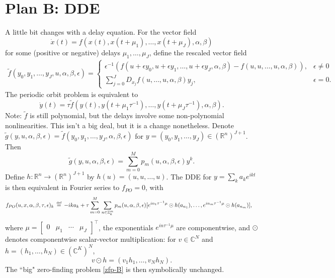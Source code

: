 \documentclass[10pt]{article}
\newcommand{\bydef}{\,\stackrel{\mbox{\tiny\textnormal{\raisebox{0ex}[0ex][0ex]{def}}}}{=}\,}
\newcommand{\R}{\mathbb{R}}
\newcommand{\Z}{\mathbb{Z}}
\newcommand{\C}{\mathbb{C}}
\begin{document}
\section{Plan B: DDE}
A little bit changes with a delay equation. For the vector field
$$\dot x(t)=f(x(t),x(t+\mu_1),\dots,x(t+\mu_J),\alpha,\beta)$$ for some (positive or negative) delays $\mu_1,\dots,\mu_J$, define the rescaled vector field
\begin{align*}
\tilde f(y_0,y_1,\dots,y_J,u,\alpha,\beta,\epsilon)=\left\{\begin{array}{ll}
\epsilon^{-1}(f(u+\epsilon y_0,u+\epsilon y_1,\dots,u+\epsilon y_J,\alpha,\beta)-f(u,u,\dots,u,\alpha,\beta)),&\epsilon\neq 0\\
\sum_{j=0}^J D_{x_j}f(u,\dots,u,\alpha,\beta)y_j,&\epsilon=0.\end{array}\right.
\end{align*}
The periodic orbit problem is equivalent to
$$\dot y(t) = \tau\tilde f(y(t),y(t+\mu_1\tau^{-1}),\dots,y(t+\mu_J\tau^{-1}),\alpha,\beta).$$
Note: $\tilde f$ is still polynomial, but the delays involve some non-polynomial nonlinearities. This isn't a big deal, but it is a change nonetheless.
Denote $\tilde g(y,u,\alpha,\beta,\epsilon)=\tilde f(y_0,y_1,\dots,y_J,\alpha,\beta,\epsilon)$ for $y=(y_0,y_1,\dots,y_J)\in(\R^n)^{J+1}$. Then
$$\tilde g(y,u,\alpha,\beta,\epsilon)=\sum_{m=0}^M p_m(u,\alpha,\beta,\epsilon)y^k.$$
Define $h:\R^n\rightarrow(\R^n)^{J+1}$ by $h(u)=(u,u,\dots,u)$. The DDE for $y=\sum_k a_ke^{ikt}$ is then equivalent in Fourier series to $f_{PO}=0$, with
\begin{align*}
f_{PO}(u,x,\alpha,\beta,\tau,\epsilon)_k&\bydef-ika_k + \tau\sum_{m=0}^M\hspace{0.5mm}\sum_{n\in \Z^m_k}p_m(u,\alpha,\beta,\epsilon)[e^{in_1\tau^{-1}\mu}\odot h(a_{n_1}),\dots,e^{in_m\tau^{-1}\mu}\odot h(a_{n_m})],
\end{align*}
where $\mu=[\begin{array}{cccc}0&\mu_1&\cdots&\mu_J\end{array}]^\intercal$, the exponentials $e^{in\tau^{-1}\mu}$ are componentwise, and $\odot$ denotes componentwise scalar-vector multiplication: for $v\in\C^N$ and $h=(h_1,\dots,h_N)\in(\C^K)^N$, $$v\odot h = (v_1h_1,\dots,v_Nh_N).$$
The ``big" zero-finding problem \eqref{zfp-B} is then symbolically unchanged.
\end{document}
